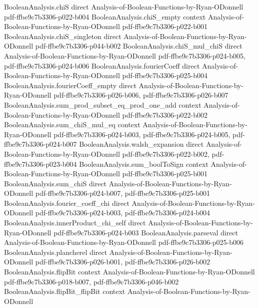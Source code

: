 \begin{lemma}
\proofstep
  {BooleanAnalysis.chiS}
  {direct}
  {Analysis-of-Boolean-Functions-by-Ryan-ODonnell}
  {pdf-ffbe9c7b3306-p022-b004}
\proofstep
  {BooleanAnalysis.chiS_empty}
  {context}
  {Analysis-of-Boolean-Functions-by-Ryan-ODonnell}
  {pdf-ffbe9c7b3306-p022-b001}
\proofstep
  {BooleanAnalysis.chiS_singleton}
  {direct}
  {Analysis-of-Boolean-Functions-by-Ryan-ODonnell}
  {pdf-ffbe9c7b3306-p044-b002}
\proofstep
  {BooleanAnalysis.chiS_mul_chiS}
  {direct}
  {Analysis-of-Boolean-Functions-by-Ryan-ODonnell}
  {pdf-ffbe9c7b3306-p024-b005,
    pdf-ffbe9c7b3306-p024-b006}
\proofstep
  {BooleanAnalysis.fourierCoeff}
  {direct}
  {Analysis-of-Boolean-Functions-by-Ryan-ODonnell}
  {pdf-ffbe9c7b3306-p025-b004}
\proofstep
  {BooleanAnalysis.fourierCoeff_empty}
  {direct}
  {Analysis-of-Boolean-Functions-by-Ryan-ODonnell}
  {pdf-ffbe9c7b3306-p026-b006,
    pdf-ffbe9c7b3306-p026-b007}
\proofstep
  {BooleanAnalysis.sum_prod_subset_eq_prod_one_add}
  {context}
  {Analysis-of-Boolean-Functions-by-Ryan-ODonnell}
  {pdf-ffbe9c7b3306-p022-b002}
\proofstep
  {BooleanAnalysis.sum_chiS_mul_eq}
  {context}
  {Analysis-of-Boolean-Functions-by-Ryan-ODonnell}
  {pdf-ffbe9c7b3306-p024-b003,
    pdf-ffbe9c7b3306-p024-b005,
    pdf-ffbe9c7b3306-p024-b007}
\proofstep
  {BooleanAnalysis.walsh_expansion}
  {direct}
  {Analysis-of-Boolean-Functions-by-Ryan-ODonnell}
  {pdf-ffbe9c7b3306-p022-b002,
    pdf-ffbe9c7b3306-p023-b004}
\proofstep
  {BooleanAnalysis.sum_boolToSign}
  {context}
  {Analysis-of-Boolean-Functions-by-Ryan-ODonnell}
  {pdf-ffbe9c7b3306-p025-b001}
\proofstep
  {BooleanAnalysis.sum_chiS}
  {direct}
  {Analysis-of-Boolean-Functions-by-Ryan-ODonnell}
  {pdf-ffbe9c7b3306-p024-b007,
    pdf-ffbe9c7b3306-p025-b001}
\proofstep
  {BooleanAnalysis.fourier_coeff_chi}
  {direct}
  {Analysis-of-Boolean-Functions-by-Ryan-ODonnell}
  {pdf-ffbe9c7b3306-p024-b003,
    pdf-ffbe9c7b3306-p024-b004}
\proofstep
  {BooleanAnalysis.innerProduct_chi_self}
  {direct}
  {Analysis-of-Boolean-Functions-by-Ryan-ODonnell}
  {pdf-ffbe9c7b3306-p024-b003}
\proofstep
  {BooleanAnalysis.parseval}
  {direct}
  {Analysis-of-Boolean-Functions-by-Ryan-ODonnell}
  {pdf-ffbe9c7b3306-p025-b006}
\proofstep
  {BooleanAnalysis.plancherel}
  {direct}
  {Analysis-of-Boolean-Functions-by-Ryan-ODonnell}
  {pdf-ffbe9c7b3306-p026-b001,
    pdf-ffbe9c7b3306-p026-b002}
\proofstep
  {BooleanAnalysis.flipBit}
  {context}
  {Analysis-of-Boolean-Functions-by-Ryan-ODonnell}
  {pdf-ffbe9c7b3306-p018-b007,
    pdf-ffbe9c7b3306-p046-b002}
\proofstep
  {BooleanAnalysis.flipBit_flipBit}
  {context}
  {Analysis-of-Boolean-Functions-by-Ryan-ODonnell}

\end{lemma}
